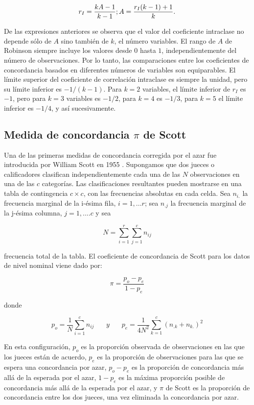 \documentclass[12pt,a4paper,]{book}
\numberwithin{dummy}{section}
\theoremstyle{ocrenumbox}
\theoremstyle{blacknumex}
\theoremstyle{blacknumbox}
\theoremstyle{ocrenum}
\theoremstyle{ocrenum}
\begin{document}
\[
r_I=\frac{kA-1}{k-1}; \\ A=\frac{r_I(k-1)+1}{k}.
\]

De las expresiones anteriores se observa que el valor del coeficiente
intraclase no depende sólo de \(A\) sino también de \(k\), el número
variables. El rango de \(A\) de Robinson siempre incluye los valores
desde \(0\) hasta \(1\), independientemente del número de observaciones.
Por lo tanto, las comparaciones entre los coeficientes de concordancia
basados en diferentes números de variables son equiparables. El límite
superior del coeficiente de correlación intraclase es siempre la unidad,
pero su límite inferior es \(-1/(k - 1)\). Para \(k = 2\) variables, el
límite inferior de \(r_I\) es \(-1\), pero para \(k = 3\) variables es
\(-1/2\), para \(k = 4\) es \(-1/3\), para \(k = 5\) el límite inferior
es \(-1/4\), y así sucesivamente.

\hypertarget{medida-de-concordancia-pi-de-scott}{%
\subsection{\texorpdfstring{Medida de concordancia \(\pi\) de
Scott}{Medida de concordancia \textbackslash pi de Scott}}\label{medida-de-concordancia-pi-de-scott}}

Una de las primeras medidas de concordancia corregida por el azar fue
introducida por William Scott en 1955 \citep{Scott1955}. Supongamos que
dos jueces o calificadores clasifican independientemente cada una de las
\(N\) observaciones en una de las \(c\) categorías. Las clasificaciones
resultantes pueden mostrarse en una tabla de contingencia \(c\times c\),
con las frecuencias absolutas en cada celda. Sea \(n_{i.}\) la
frecuencia marginal de la i-ésima fila, \(i = 1, . . . r\); sea
\(n_{.j}\) la frecuencia marginal de la j-ésima columna,
\(j = 1, . . . . c\) y sea

\[
N=\sum_{i=1}^r\sum_{j=1}^cn_{ij}
\]

frecuencia total de la tabla. El coeficiente de concordancia de Scott
para los datos de nivel nominal viene dado por:

\[
\pi=\frac{p_o-p_e}{1-p_e}
\]

donde

\[
p_o=\frac{1}{N}\sum_{i=1}^c n_{ij} ~~~~~~~~ y ~~~~~~~~ p_e=\frac{1}{4N^2}\sum_{k=1}^c(n_{.k}+n_{k.})^2
\]

En esta configuración, \(p_o\) es la proporción observada de
observaciones en las que los jueces están de acuerdo, \(p_e\) es la
proporción de observaciones para las que se espera una concordancia por
azar, \(p_o - p_e\) es la proporción de concordancia más allá de la
esperada por el azar, \(1 - p_e\) es la máxima proporción posible de
concordancia más allá de la esperada por el azar, y \(\pi\) de Scott es
la proporción de concordancia entre los dos jueces, una vez eliminada la
concordancia por azar.
\end{document}
